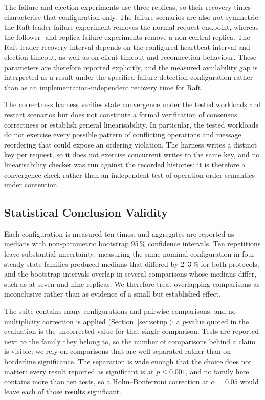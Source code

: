 The failure and election experiments use three replicas, so their recovery
times characterise that configuration only. The failure scenarios are also
not symmetric: the Raft leader-failure experiment removes the normal
request endpoint, whereas the follower- and replica-failure experiments
remove a non-central replica. The Raft leader-recovery interval depends on
the configured heartbeat interval and election timeout, as well as on
client timeout and reconnection behaviour. These parameters are therefore
reported explicitly, and the measured availability gap is interpreted as
a result under the specified failure-detection configuration rather than
as an implementation-independent recovery time for Raft.

The correctness harness verifies state convergence under the tested
workloads and restart scenarios but does not constitute a formal
verification of consensus correctness or establish general linearisability.
In particular, the tested workloads do not exercise every possible pattern
of conflicting operations and message reordering that could expose an
ordering violation. The harness writes a distinct key per request, so it
does not exercise concurrent writes to the same key, and no linearisability
checker was run against the recorded histories; it is therefore a
convergence check rather than an independent test of operation-order
semantics under contention.

\subsection{Statistical Conclusion Validity}

Each configuration is measured ten times, and aggregates are reported as
medians with non-parametric bootstrap 95\,\% confidence intervals. Ten
repetitions leave substantial uncertainty: measuring the same nominal
configuration in four steady-state families produced medians that differed
by 2--3\,\% for both protocols, and the bootstrap intervals overlap in
several comparisons whose medians differ, such as at seven and nine
replicas. We therefore treat overlapping comparisons as inconclusive rather
than as evidence of a small but established effect.

The suite contains many configurations and pairwise comparisons, and no
multiplicity correction is applied (Section~\ref{sec:setup}): a $p$-value
quoted in the evaluation is the uncorrected value for that single
comparison. Tests are reported next to the family they belong to, so the
number of comparisons behind a claim is visible; we rely on comparisons
that are well separated rather than on borderline significance. The
separation is wide enough that the choice does not matter: every result
reported as significant is at $p\le0.001$, and no family here contains more
than ten tests, so a Holm--Bonferroni correction at $\alpha=0.05$ would
leave each of those results significant.

